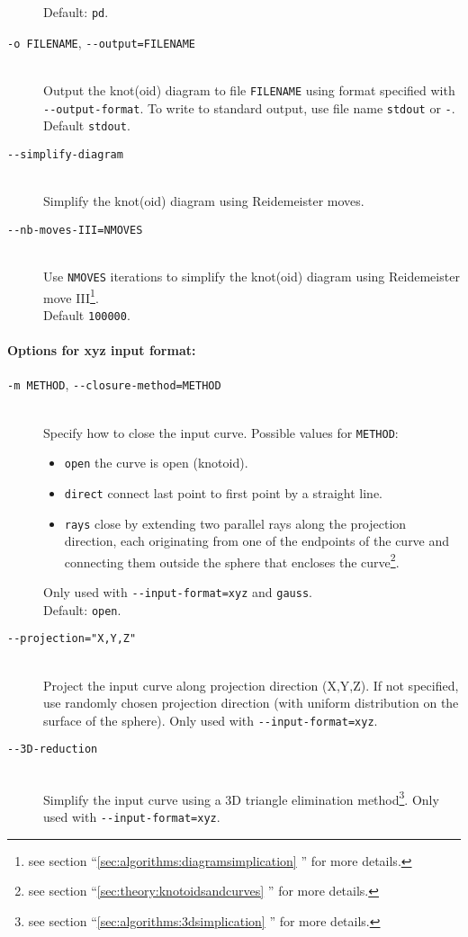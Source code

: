 \begin{description}
  Default: \lstinline{pd}.
\item[\lstinline{-o FILENAME}, \lstinline{--output=FILENAME}]\hfill\\
  Output the knot(oid) diagram to file \lstinline{FILENAME} using format specified with \lstinline{--output-format}.  To write to standard output, use file name \lstinline{stdout} or \lstinline{-}.\\
  Default \lstinline{stdout}.
\item[\lstinline{--simplify-diagram}]\hfill\\
  Simplify the knot(oid) diagram using Reidemeister moves.
\item[\lstinline{--nb-moves-III=NMOVES}]\hfill\\
  Use \lstinline{NMOVES} iterations to simplify the knot(oid) diagram using Reidemeister move III\footnote{see section  ``\ref{sec:algorithms:diagramsimplication} '' for more details.}.\\
  Default \lstinline{100000}.
\end{description}
\paragraph{Options for xyz input format:}
\begin{description}
\item[\lstinline{-m METHOD}, \lstinline{--closure-method=METHOD}]\hfill\\
  Specify how to close the input curve. Possible values for \lstinline{METHOD}:
  \begin{itemize}
  \item \lstinline{open} the curve is open (knotoid).
  \item \lstinline{direct} connect last point to first point by a straight line.
  \item \lstinline{rays} close by extending two parallel rays along the projection direction, each originating from one of the endpoints of the curve and connecting them outside the sphere that encloses the curve\footnote{see section ``\ref{sec:theory:knotoidsandcurves} '' for more details.}.
  \end{itemize}
  Only used with \lstinline{--input-format=xyz} and \lstinline{gauss}.\\
  Default: \lstinline{open}.  
\item[\lstinline{--projection="X,Y,Z"}]\hfill\\
  Project the input curve along projection direction (X,Y,Z). If not specified, use randomly chosen projection direction (with uniform distribution on the surface of the sphere). Only used with \lstinline{--input-format=xyz}.
\item[\lstinline{--3D-reduction}]\hfill\\
  Simplify the input curve using a 3D triangle elimination method\footnote{see section  ``\ref{sec:algorithms:3dsimplication} '' for more details.}. Only used with \lstinline{--input-format=xyz}.
\end{description}
